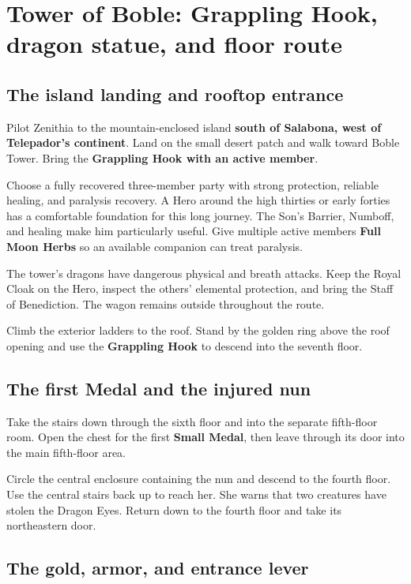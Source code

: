 \section{Tower of Boble: Grappling Hook, dragon statue, and floor route}

\subsection*{The island landing and rooftop entrance}

Pilot Zenithia to the mountain-enclosed island
\textbf{south of Salabona, west of Telepador's continent}.
Land on the small desert patch and walk toward Boble Tower.
Bring the \textbf{Grappling Hook with an active member}.

Choose a fully recovered three-member party with strong
protection, reliable healing, and paralysis recovery. A Hero
around the high thirties or early forties has a comfortable
foundation for this long journey. The Son's Barrier, Numboff,
and healing make him particularly useful. Give multiple active
members \textbf{Full Moon Herbs} so an available companion
can treat paralysis.

The tower's dragons have dangerous physical and breath attacks.
Keep the Royal Cloak on the Hero, inspect the others' elemental
protection, and bring the Staff of Benediction. The wagon remains
outside throughout the route.

Climb the exterior ladders to the roof. Stand by the golden
ring above the roof opening and use the \textbf{Grappling Hook}
to descend into the seventh floor.

\subsection*{The first Medal and the injured nun}

Take the stairs down through the sixth floor and into the
separate fifth-floor room. Open the chest for the first
\textbf{Small Medal}, then leave through its door into the
main fifth-floor area.

Circle the central enclosure containing the nun and descend
to the fourth floor. Use the central stairs back up to reach
her. She warns that two creatures have stolen the Dragon Eyes.
Return down to the fourth floor and take its northeastern door.

\subsection*{The gold, armor, and entrance lever}

